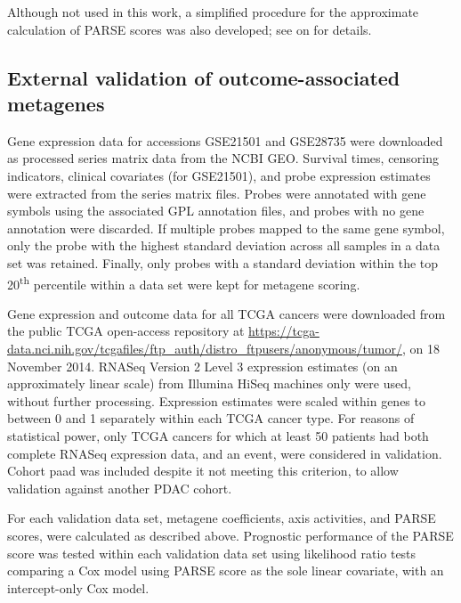 \documentclass[dissertation.tex]{subfiles}
\begin{document}
Although not used in this work, a simplified procedure for the approximate calculation of \gls{PARSE} scores was also developed; see  on  for details.

\subsection{External validation of outcome-associated metagenes}
Gene expression data for accessions GSE21501 and GSE28735 were downloaded as processed series matrix data from the \gls{NCBI} \gls{GEO}.  Survival times, censoring indicators, clinical covariates (for GSE21501), and probe expression estimates were extracted from the series matrix files.  Probes were annotated with gene symbols using the associated GPL annotation files, and probes with no gene annotation were discarded.  If multiple probes mapped to the same gene symbol, only the probe with the highest standard deviation across all samples in a data set was retained.  Finally, only probes with a standard deviation within the top 20\textsuperscript{th} percentile within a data set were kept for metagene scoring.

Gene expression and outcome data for all \gls{TCGA} cancers were downloaded from the public \gls{TCGA} open-access repository at \url{https://tcga-data.nci.nih.gov/tcgafiles/ftp_auth/distro_ftpusers/anonymous/tumor/}, on 18 November 2014.  RNASeq Version 2 Level 3 expression estimates (on an approximately linear scale) from Illumina HiSeq machines only were used, without further processing.  Expression estimates were scaled within genes to between 0 and 1 separately within each \gls{TCGA} cancer type.  For reasons of statistical power, only \gls{TCGA} cancers for which at least 50 patients had both complete RNASeq expression data, and an event, were considered in validation.  Cohort paad was included despite it not meeting this criterion, to allow validation against another \gls{PDAC} cohort.

For each validation data set, metagene coefficients, axis activities, and \gls{PARSE} scores, were calculated as described above.  Prognostic performance of the \gls{PARSE} score was tested within each validation data set using likelihood ratio tests comparing a Cox model using \gls{PARSE} score as the sole linear covariate, with an intercept-only Cox model.
\end{document}
